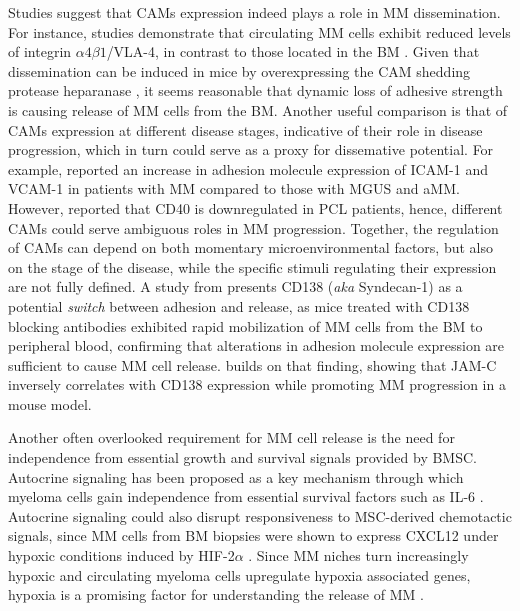 Studies suggest that \acp{CAM} expression indeed plays a role in \ac{MM}
dissemination. For instance, studies demonstrate that circulating \ac{MM} cells
exhibit reduced levels of integrin $\alpha4\beta1$/VLA-4, in contrast to those located
in the \ac{BM} \cite{paivaDetailedCharacterizationMultiple2013,
    paivaCompetitionClonalPlasma2011}. Given that dissemination can be induced in
mice by overexpressing the \ac{CAM} shedding protease heparanase
\cite{yangHeparanasePromotesSpontaneous2005}, it seems reasonable that dynamic
loss of adhesive strength is causing release of \ac{MM} cells from the \ac{BM}.
Another useful comparison is that of \acp{CAM} expression at different disease
stages, indicative of their role in disease progression, which in turn could
serve as a proxy for dissemative potential. For example,
\citet{terposIncreasedCirculatingVCAM12016}
reported an increase in adhesion molecule expression of ICAM-1 and VCAM-1 in
patients with \ac{MM} compared to those with \ac{MGUS} and \ac{aMM}. However,
\citet{perez-andresClonalPlasmaCells2005} reported that CD40 is downregulated in
\ac{PCL} patients, hence, different \acp{CAM} could serve ambiguous roles in
\ac{MM} progression. Together, the regulation of \acp{CAM} can depend on both
momentary microenvironmental factors, but also on the stage of the disease,
while the specific stimuli regulating their expression are not fully defined. A
study from \citet{akhmetzyanovaDynamicCD138Surface2020} presents CD138
(\textit{aka} Syndecan-1) as a potential \textit{switch} between adhesion and
release, as mice treated with CD138 blocking antibodies exhibited
rapid mobilization of \ac{MM} cells from the \ac{BM} to peripheral blood,
confirming that alterations in adhesion molecule expression are sufficient to
cause \ac{MM} cell release. \citet{brandlJunctionalAdhesionMolecule2022}
builds on that finding, showing that JAM-C inversely correlates with CD138
expression while promoting \ac{MM} progression in a mouse model.


Another often overlooked requirement for \ac{MM} cell release is the need for
independence from essential growth and survival signals provided by \ac{BMSC}.
Autocrine signaling has been proposed as a key mechanism through which myeloma
cells gain independence from essential survival factors such as IL-6
\cite{frassanitoAutocrineInterleukin6Production2001,
    urashimaCD40LigandTriggered1995}. Autocrine signaling could also disrupt
responsiveness to \ac{MSC}-derived chemotactic signals, since \ac{MM} cells from
\ac{BM} biopsies were shown to express CXCL12 under hypoxic conditions induced
by HIF-2$\alpha$ \cite{martinHypoxiainducibleFactor2Novel2010}. Since \ac{MM}
niches turn increasingly hypoxic and circulating myeloma cells upregulate
hypoxia associated genes, hypoxia is a promising factor for understanding the
release of \ac{MM} \cite{garcesTranscriptionalProfilingCirculating2020}.



